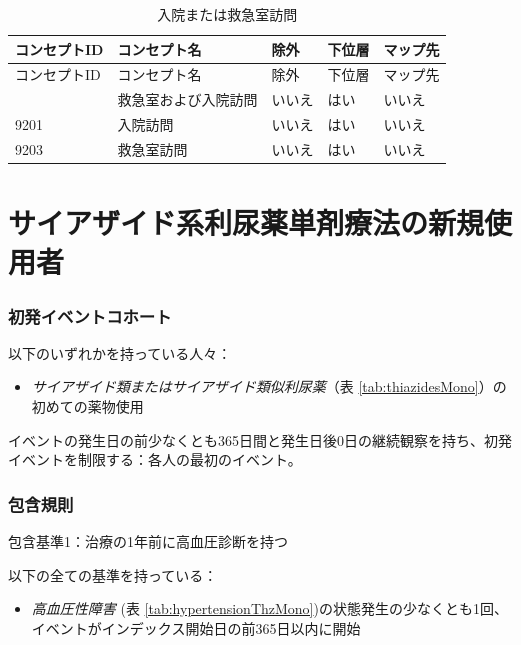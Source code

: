 \documentclass[
  11pt]{book}
\providecommand{\tightlist}{%
  \setlength{\itemsep}{0pt}\setlength{\parskip}{0pt}}
\theoremstyle{definition}
\theoremstyle{definition}
\theoremstyle{definition}
\theoremstyle{definition}
\theoremstyle{remark}
\begin{document}
\begin{longtable}[]{@{}lllll@{}}
\caption{\label{tab:inpatientOrEr} 入院または救急室訪問}\tabularnewline
\toprule\noalign{}
コンセプトID & コンセプト名 & 除外 & 下位層 & マップ先 \\
\midrule\noalign{}
\endfirsthead
\toprule\noalign{}
コンセプトID & コンセプト名 & 除外 & 下位層 & マップ先 \\
\midrule\noalign{}
\endhead
\bottomrule\noalign{}
\endlastfoot
262 & 救急室および入院訪問 & いいえ & はい & いいえ \\
9201 & 入院訪問 & いいえ & はい & いいえ \\
9203 & 救急室訪問 & いいえ & はい & いいえ \\
\end{longtable}

\section{サイアザイド系利尿薬単剤療法の新規使用者}\label{ThiazidesMono}

\subsubsection*{初発イベントコホート}\label{ux521dux767aux30a4ux30d9ux30f3ux30c8ux30b3ux30dbux30fcux30c8-1}

以下のいずれかを持っている人々：

\begin{itemize}
\tightlist
\item
  \emph{サイアザイド類またはサイアザイド類似利尿薬}（表 \ref{tab:thiazidesMono}）の初めての薬物使用
\end{itemize}

イベントの発生日の前少なくとも365日間と発生日後0日の継続観察を持ち、初発イベントを制限する：各人の最初のイベント。

\subsubsection*{包含規則}\label{ux5305ux542bux898fux5247}

包含基準1：治療の1年前に高血圧診断を持つ

以下の全ての基準を持っている：

\begin{itemize}
\tightlist
\item
  \emph{高血圧性障害} (表 \ref{tab:hypertensionThzMono})の状態発生の少なくとも1回、イベントがインデックス開始日の前365日以内に開始
\end{itemize}
\end{document}

